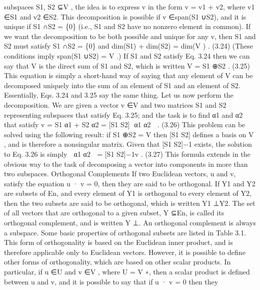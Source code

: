 subspaces S1, S2 ⊆V , the idea is to express v in the form v = v1 + v2, where v1 ∈S1 and v2 ∈S2. This decomposition is possible if v ∈span(S1 ∪S2), and it is unique if S1 ∩S2 = \{0\} (i.e., S1 and S2 have no nonzero element in common). If we want the decomposition to be both possible and unique for any v, then S1 and S2 must satisfy S1 ∩S2 = \{0\} and dim(S1) + dim(S2) = dim(V ) . (3.24) (These conditions imply span(S1 ∪S2) = V .) If S1 and S2 satisfy Eq. 3.24 then we can say that V is the direct sum of S1 and S2, which is written V = S1 ⊕S2 . (3.25) This equation is simply a short-hand way of saying that any element of V can be decomposed uniquely into the sum of an element of S1 and an element of S2. Essentially, Eqs. 3.24 and 3.25 say the same thing. Let us now perform the decomposition. We are given a vector v ∈V and two matrices S1 and S2 representing subspaces that satisfy Eq. 3.25; and the task is to find α1 and α2 that satisfy v = S1 α1 + S2 α2 = [S1 S2] α1 α2  . (3.26) This problem can be solved using the following result: if S1 ⊕S2 = V then [S1 S2] defines a basis on V , and is therefore a nonsingular matrix. Given that [S1 S2]−1 exists, the solution to Eq. 3.26 is simply  α1 α2  = [S1 S2]−1v . (3.27) This formula extends in the obvious way to the task of decomposing a vector into components in more than two subspaces. Orthogonal Complements If two Euclidean vectors, u and v, satisfy the equation u · v = 0, then they are said to be orthogonal. If Y1 and Y2 are subsets of En, and every element of Y1 is orthogonal to every element of Y2, then the two subsets are said to be orthogonal, which is written Y1 ⊥Y2. The set of all vectors that are orthogonal to a given subset, Y ⊆En, is called its orthogonal complement, and is written Y ⊥. An orthogonal complement is always a subspace. Some basic properties of orthogonal subsets are listed in Table 3.1. This form of orthogonality is based on the Euclidean inner product, and is therefore applicable only to Euclidean vectors. However, it is possible to define other forms of orthogonality, which are based on other scalar products. In particular, if u ∈U and v ∈V , where U = V ∗, then a scalar product is defined between u and v, and it is possible to say that if u · v = 0 then they

